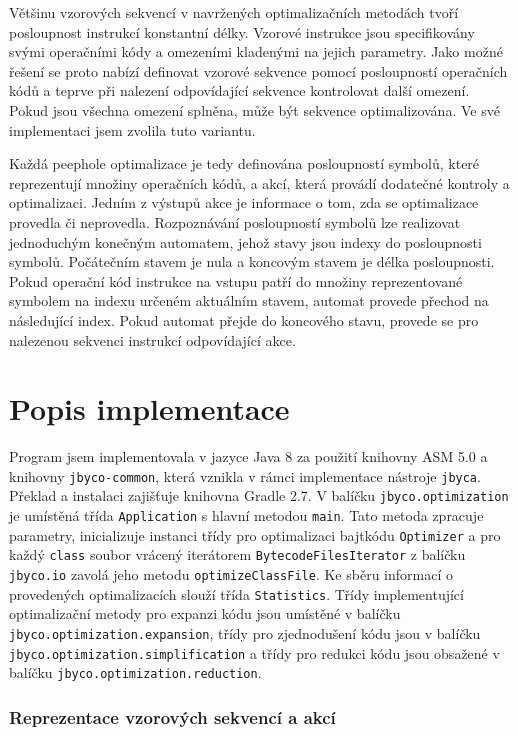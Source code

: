 Většinu vzorových sekvencí v navržených optimalizačních metodách tvoří posloupnost instrukcí konstantní délky. Vzorové instrukce jsou specifikovány svými operačními kódy a omezeními kladenými na jejich parametry. Jako možné řešení se proto nabízí definovat vzorové sekvence pomocí posloupností operačních kódů a teprve při nalezení odpovídající sekvence kontrolovat další omezení. Pokud jsou všechna omezení splněna, může být sekvence optimalizována. Ve své implementaci jsem zvolila tuto variantu. 

Každá peephole optimalizace je tedy definována posloupností symbolů, které reprezentují množiny operačních kódů, a akcí, která provádí dodatečné kontroly a optimalizaci. Jedním z výstupů akce je informace o tom, zda se optimalizace provedla či neprovedla.
Rozpoznávání posloupností symbolů lze realizovat jednoduchým konečným automatem, jehož stavy jsou indexy do posloupnosti symbolů. Počátečním stavem je nula a koncovým stavem je délka posloupnosti. Pokud operační kód instrukce na vstupu patří do množiny reprezentované symbolem na indexu určeném aktuálním stavem, automat provede přechod na následující index. Pokud automat přejde do koncového stavu, provede se pro nalezenou sekvenci instrukcí odpovídající akce.

\section{Popis implementace}

Program jsem implementovala v jazyce Java 8 za použití knihovny ASM 5.0 a knihovny \texttt{jbyco-common}, která vznikla v rámci implementace nástroje \texttt{jbyca}. Překlad a instalaci zajišťuje knihovna Gradle 2.7. V balíčku \texttt{jbyco.optimization} je umístěná třída \texttt{Application} s hlavní metodou \texttt{main}. Tato metoda zpracuje parametry, inicializuje instanci třídy  pro optimalizaci bajtkódu \texttt{Optimizer} a pro každý \texttt{class} soubor vrácený iterátorem \texttt{BytecodeFilesIterator} z balíčku \texttt{jbyco.io} zavolá jeho metodu \texttt{optimizeClassFile}. Ke sběru informací o provedených optimalizacích slouží třída \texttt{Statistics}. Třídy implementující optimalizační metody pro expanzi kódu jsou umístěné v balíčku \texttt{jbyco.optimization.expansion}, třídy pro zjednodušení kódu jsou v balíčku \texttt{jbyco.optimization.simplification} a třídy pro redukci kódu jsou obsažené v balíčku \texttt{jbyco.optimization.reduction}.

\subsubsection{Reprezentace vzorových sekvencí a akcí}

